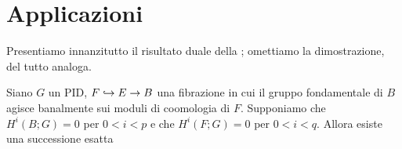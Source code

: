 \section{Applicazioni}
Presentiamo innanzitutto il risultato duale della ; omettiamo la dimostrazione, del tutto analoga.
\begin{proposition}
Siano \(G\) un PID, \(F\hookrightarrow E\to B\) una fibrazione in cui il gruppo fondamentale di \(B\) agisce banalmente sui moduli di coomologia di \(F\). Supponiamo che \(H^i(B;G)=0\) per \(0<i<p\) e che \(H^i(F;G)=0\) per \(0<i<q\). Allora esiste una successione esatta
\end{proposition}

